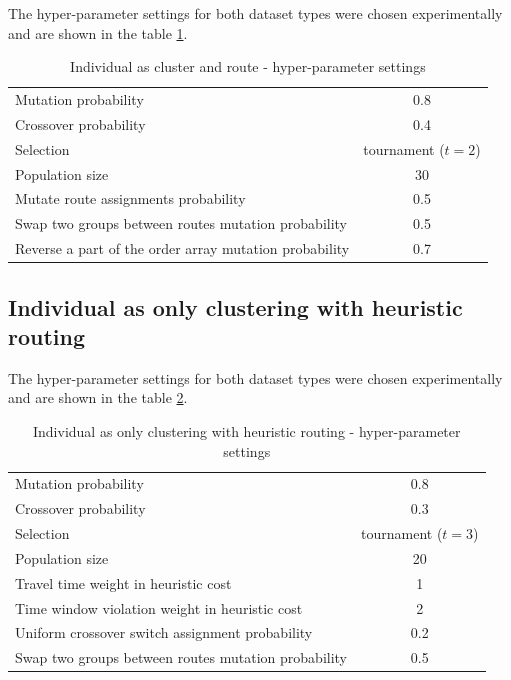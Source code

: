 The hyper-parameter settings for both dataset types were chosen experimentally and are shown in the table \ref{tab:evo_cr_hyperparams}.

\begin{table}[ht]
    \centering
    \begin{tabular}{lc}
        Mutation probability & 0.8 \\
        Crossover probability & 0.4 \\
        Selection & tournament ($t=2$) \\
        Population size & 30 \\
        Mutate route assignments probability & 0.5 \\
        Swap two groups between routes mutation probability & 0.5 \\
        Reverse a part of the order array mutation probability & 0.7 \\
    \end{tabular}
    \caption{Individual as cluster and route - hyper-parameter settings}
    \label{tab:evo_cr_hyperparams}
\end{table}

\subsection{Individual as only clustering with heuristic routing}

The hyper-parameter settings for both dataset types were chosen experimentally and are shown in the table \ref{tab:evo_ch_hyperparams}.

\begin{table}[ht]
    \centering
    \begin{tabular}{lc}
        Mutation probability & 0.8 \\
        Crossover probability & 0.3 \\
        Selection & tournament ($t=3$) \\
        Population size & 20 \\
        Travel time weight in heuristic cost & 1 \\
        Time window violation weight in heuristic cost & 2 \\
        Uniform crossover switch assignment probability & 0.2 \\
        Swap two groups between routes mutation probability & 0.5 \\
    \end{tabular}
    \caption{Individual as only clustering with heuristic routing - hyper-parameter settings}
    \label{tab:evo_ch_hyperparams}
\end{table}